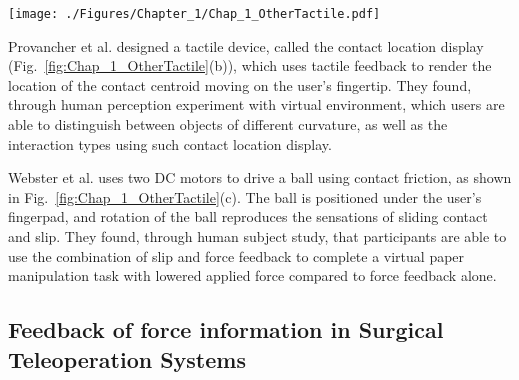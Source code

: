 \begin{figure*}[h]
\centering
\texttt{[image: ./Figures/Chapter\_1/Chap\_1\_OtherTactile.pdf]}
\caption{\small(a) Multiple-contact shear display using mechanical linkages and servo motos (b) Contact location display (c) 2-D slip display. Photos adapted from \cite{Drewing2005}, \cite{Park2012}, and \cite{Webster2005} respectively.}
\label{fig:Chap_1_OtherTactile}
\end{figure*}

Provancher et al. \cite{Provancher2005} designed a tactile device, called the contact location display (Fig.~\ref{fig:Chap_1_OtherTactile}(b)), which uses tactile feedback to render the location of the contact centroid moving on the user's fingertip. They found, through human perception experiment with virtual environment, which users are able to distinguish between objects of different curvature, as well as the interaction types using such contact location display.

Webster et al. \cite{Webster2005} uses two DC motors to drive a ball using contact friction, as shown in Fig.~\ref{fig:Chap_1_OtherTactile}(c). The ball is positioned under the user's fingerpad, and rotation of the ball reproduces the sensations of sliding contact and slip. They found, through human subject study, that participants are able to use the combination of slip and force feedback to complete a virtual paper manipulation task with lowered applied force compared to force feedback alone.

\subsection{Feedback of force information in Surgical Teleoperation Systems}

